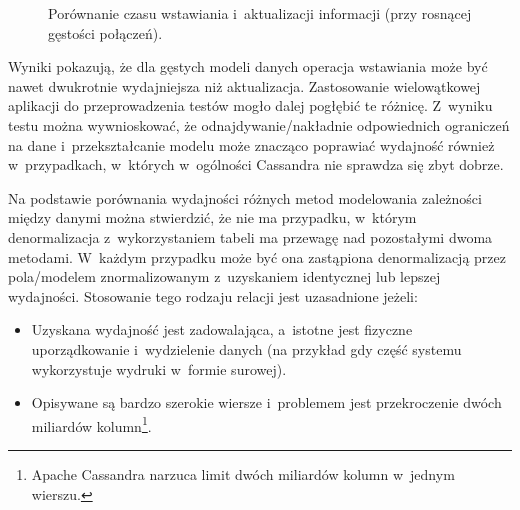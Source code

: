 \begin{figure}[ht!]
	\centering

	\caption{Porównanie czasu wstawiania i~aktualizacji informacji (przy rosnącej gęstości połączeń).}
	\label{fig:update_vs_insert_time_density_comparison}
\end{figure}

Wyniki pokazują, że dla gęstych modeli danych operacja wstawiania może być nawet dwukrotnie wydajniejsza niż aktualizacja. Zastosowanie wielowątkowej aplikacji do przeprowadzenia testów mogło dalej pogłębić te różnicę. Z~wyniku testu można wywnioskować, że odnajdywanie/nakładnie odpowiednich ograniczeń na dane i~przekształcanie modelu może znacząco poprawiać wydajność również w~przypadkach, w~których w~ogólności Cassandra nie sprawdza się zbyt dobrze.

Na podstawie porównania wydajności różnych metod modelowania zależności między danymi można stwierdzić, że nie ma przypadku, w~którym denormalizacja z~wykorzystaniem tabeli ma przewagę nad pozostałymi dwoma metodami. W~każdym przypadku może być ona zastąpiona denormalizacją przez pola/modelem znormalizowanym z~uzyskaniem identycznej lub lepszej wydajności. Stosowanie tego rodzaju relacji jest uzasadnione jeżeli:

\begin{itemize}
	\item Uzyskana wydajność jest zadowalająca, a~istotne jest fizyczne uporządkowanie i~wydzielenie danych (na przykład gdy część systemu wykorzystuje wydruki w~formie surowej).
	\item Opisywane są bardzo szerokie wiersze i~problemem jest przekroczenie dwóch miliardów kolumn\footnote{Apache Cassandra narzuca limit dwóch miliardów kolumn w~jednym wierszu.}.
\end{itemize}

